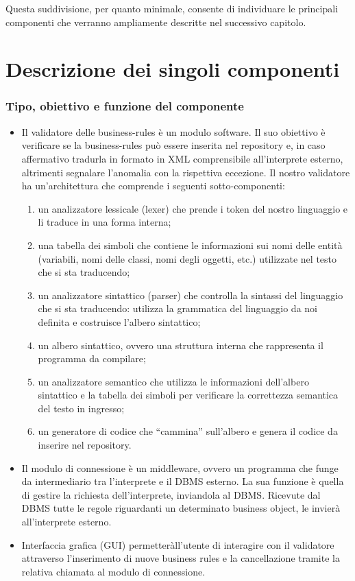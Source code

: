 \documentclass[11pt,titlepage,a4paper]{report}
\begin{document}
Questa suddivisione, per quanto minimale, consente di individuare le principali componenti che verranno ampliamente descritte nel successivo capitolo.

\chapter{Descrizione dei singoli componenti}
\subsection{Tipo, obiettivo e funzione del componente}

\begin{itemize}
\item Il validatore delle business-rules \`e un modulo software. Il suo obiettivo \`e verificare se la business-rules pu\`o essere inserita nel repository e, in caso affermativo tradurla in formato in XML comprensibile all'interprete esterno, altrimenti segnalare l'anomalia con  la rispettiva eccezione. Il nostro validatore ha un'architettura che comprende i seguenti sotto-componenti:
\begin{enumerate}
\item un analizzatore lessicale (lexer) che prende i token del nostro linguaggio e li traduce in una forma interna;
\item una tabella dei simboli che contiene le informazioni sui nomi delle entit\`a (variabili, nomi delle classi, nomi degli oggetti, etc.) utilizzate nel testo che si sta traducendo;
\item un analizzatore sintattico (parser) che controlla la sintassi del linguaggio che si sta traducendo: utilizza la grammatica del linguaggio da noi definita e costruisce l'albero sintattico;
\item un albero sintattico, ovvero una struttura interna che rappresenta il programma da compilare;
\item un analizzatore semantico che utilizza le informazioni dell'albero sintattico e la tabella dei simboli per verificare la correttezza semantica del testo in ingresso;
\item un generatore di codice che ``cammina'' sull'albero e genera il codice da inserire nel repository.
\end{enumerate}

\item Il modulo di connessione \`e un middleware, ovvero un programma che funge da intermediario tra l'interprete e il DBMS esterno. La sua funzione \`e quella di gestire la richiesta dell'interprete, inviandola al DBMS. Ricevute dal DBMS tutte le regole riguardanti un determinato business object, le invier\`a all'interprete esterno.
\item Interfaccia grafica (GUI) permetter\` all'utente di interagire con il validatore attraverso l'inserimento di nuove business rules e la cancellazione tramite la relativa chiamata al modulo di connessione.

\end{itemize}
\end{document}
